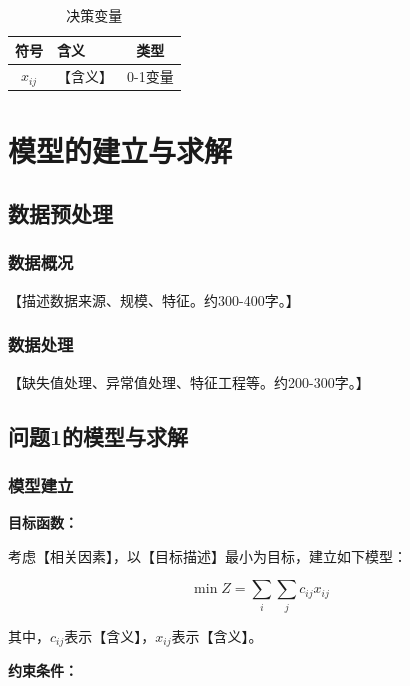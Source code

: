 \documentclass[12pt,a4paper]{ctexart}
\numberwithin{equation}{section}
\numberwithin{figure}{section}
\numberwithin{table}{section}
\begin{document}
\begin{table}[H]
\centering
\caption{决策变量}
\begin{tabular}{c|l|c}
\toprule
\textbf{符号} & \textbf{含义} & \textbf{类型} \\
\midrule
$x_{ij}$ & 【含义】 & 0-1变量 \\
\bottomrule
\end{tabular}
\end{table}

\section{模型的建立与求解}

\subsection{数据预处理}
\subsubsection{数据概况}
【描述数据来源、规模、特征。约300-400字。】

\subsubsection{数据处理}
【缺失值处理、异常值处理、特征工程等。约200-300字。】

\subsection{问题1的模型与求解}

\subsubsection{模型建立}

\textbf{目标函数：}

考虑【相关因素】，以【目标描述】最小为目标，建立如下模型：

\begin{equation}\label{eq:obj}
\min Z = \sum_{i} \sum_{j} c_{ij} x_{ij}
\end{equation}

其中，$c_{ij}$表示【含义】，$x_{ij}$表示【含义】。

\textbf{约束条件：}
\end{document}
